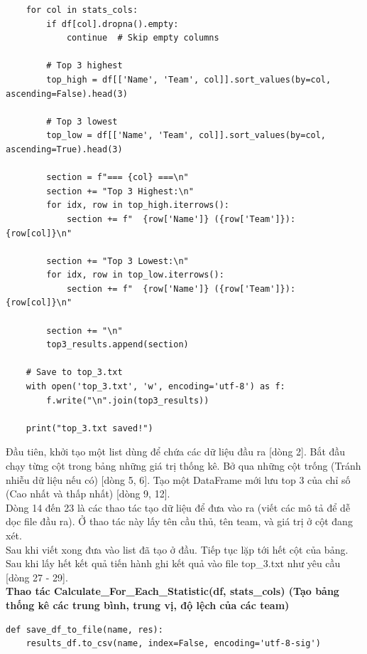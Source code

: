 \documentclass[12pt]{report}
\begin{document}
{\begin{lstlisting}
    for col in stats_cols:
        if df[col].dropna().empty:
            continue  # Skip empty columns
        
        # Top 3 highest
        top_high = df[['Name', 'Team', col]].sort_values(by=col, ascending=False).head(3)
        
        # Top 3 lowest
        top_low = df[['Name', 'Team', col]].sort_values(by=col, ascending=True).head(3)
        
        section = f"=== {col} ===\n"
        section += "Top 3 Highest:\n"
        for idx, row in top_high.iterrows():
            section += f"  {row['Name']} ({row['Team']}): {row[col]}\n"
        
        section += "Top 3 Lowest:\n"
        for idx, row in top_low.iterrows():
            section += f"  {row['Name']} ({row['Team']}): {row[col]}\n"
        
        section += "\n"
        top3_results.append(section)

    # Save to top_3.txt
    with open('top_3.txt', 'w', encoding='utf-8') as f:
        f.write("\n".join(top3_results))

    print("top_3.txt saved!")
\end{lstlisting}
Đầu tiên, khởi tạo một list dùng để chứa các dữ liệu đầu ra [dòng 2]. Bắt đầu chạy từng cột trong bảng những giá trị thống kê. Bở qua những cột trống (Tránh nhiễu dữ liệu nếu có) [dòng 5, 6]. Tạo một DataFrame mới lưu top 3 của chỉ số (Cao nhất và thấp nhất) [dòng 9, 12].\\
Dòng 14 đến 23 là các thao tác tạo dữ liệu để đưa vào ra (viết các mô tả để dễ dọc file đầu ra). Ở thao tác này lấy tên cầu thủ, tên team, và giá trị ở cột đang xét.\\
Sau khi viết xong đưa vào list đã tạo ở đầu. Tiếp tục lặp tới hết cột của bảng.\\
Sau khi lấy hết kết quả tiến hành ghi kết quả vào file top\_3.txt như yêu cầu [dòng 27 - 29].\\

\textbf* {Thao tác Calculate\_For\_Each\_Statistic(df, stats\_cols) (Tạo bảng thống kê các trung bình, trung vị, độ lệch của các team)}
\begin{lstlisting}
def save_df_to_file(name, res):
    results_df.to_csv(name, index=False, encoding='utf-8-sig')


\end{lstlisting}}
\end{document}
